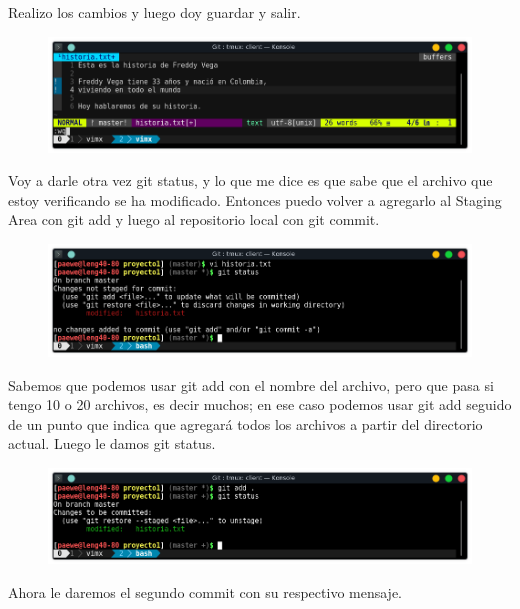 \documentclass{article}
\begin{document}
Realizo los cambios y luego doy guardar y salir.

\begin{figure}[h!]
  \centering
  \includegraphics[scale=0.75]{./Pictures/080_save_exit_vim.png}
\end{figure}

Voy a darle otra vez git status, y lo que me dice es que sabe que el archivo
que estoy verificando se ha modificado. Entonces puedo volver a agregarlo al
Staging Area con git add y luego al repositorio local con git commit.

\begin{figure}[h!]
  \centering
  \includegraphics[scale=0.75]{./Pictures/081_unstaged.png}
\end{figure}

Sabemos que podemos usar git add con el nombre del archivo, pero que pasa si
tengo 10 o 20 archivos, es decir muchos; en ese caso podemos usar git add
seguido de un punto que indica que agregará todos los archivos a partir del
directorio actual. Luego le damos git status.

\newpage

\begin{figure}[h!]
  \centering
  \includegraphics[scale=0.75]{./Pictures/082_staged.png}
\end{figure}

Ahora le daremos el segundo commit con su respectivo mensaje.
\end{document}
